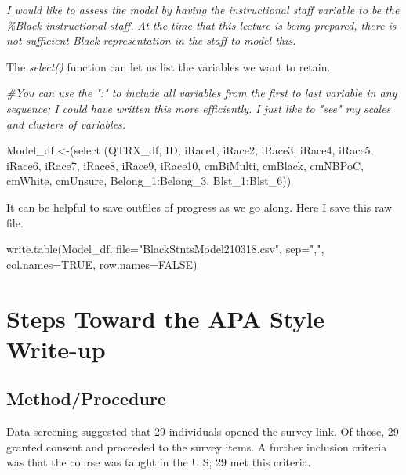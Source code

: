 \documentclass[
  english,
]{book}
\newenvironment{Shaded}{\begin{snugshade}}{\end{snugshade}}
\newcommand{\AttributeTok}[1]{\textcolor[rgb]{0.77,0.63,0.00}{#1}}
\newcommand{\CommentTok}[1]{\textcolor[rgb]{0.56,0.35,0.01}{\textit{#1}}}
\newcommand{\ConstantTok}[1]{\textcolor[rgb]{0.00,0.00,0.00}{#1}}
\newcommand{\FunctionTok}[1]{\textcolor[rgb]{0.00,0.00,0.00}{#1}}
\newcommand{\NormalTok}[1]{#1}
\newcommand{\OtherTok}[1]{\textcolor[rgb]{0.56,0.35,0.01}{#1}}
\newcommand{\SpecialCharTok}[1]{\textcolor[rgb]{0.00,0.00,0.00}{#1}}
\newcommand{\StringTok}[1]{\textcolor[rgb]{0.31,0.60,0.02}{#1}}
\begin{document}
\emph{I would like to assess the model by having the instructional staff variable to be the \%Black instructional staff. At the time that this lecture is being prepared, there is not sufficient Black representation in the staff to model this.}

The \emph{select()} function can let us list the variables we want to retain.

\begin{Shaded}
\begin{Highlighting}[]
\CommentTok{\#You can use the ":" to include all variables from the first to last variable in any sequence; I could have written this more efficiently.  I just like to "see" my scales and clusters of variables.}

\NormalTok{Model\_df }\OtherTok{\textless{}{-}}\NormalTok{(}\FunctionTok{select}\NormalTok{ (QTRX\_df, ID, iRace1, iRace2, iRace3, iRace4, iRace5, iRace6, iRace7, iRace8, iRace9, iRace10, cmBiMulti, cmBlack, cmNBPoC, cmWhite, cmUnsure, Belong\_1}\SpecialCharTok{:}\NormalTok{Belong\_3, Blst\_1}\SpecialCharTok{:}\NormalTok{Blst\_6))}
\end{Highlighting}
\end{Shaded}

It can be helpful to save outfiles of progress as we go along. Here I save this raw file.

\begin{Shaded}
\begin{Highlighting}[]
\FunctionTok{write.table}\NormalTok{(Model\_df, }\AttributeTok{file=}\StringTok{"BlackStntsModel210318.csv"}\NormalTok{, }\AttributeTok{sep=}\StringTok{","}\NormalTok{, }\AttributeTok{col.names=}\ConstantTok{TRUE}\NormalTok{, }\AttributeTok{row.names=}\ConstantTok{FALSE}\NormalTok{)}
\end{Highlighting}
\end{Shaded}

\hypertarget{steps-toward-the-apa-style-write-up}{%
\section{Steps Toward the APA Style Write-up}\label{steps-toward-the-apa-style-write-up}}

\hypertarget{methodprocedure}{%
\subsection{Method/Procedure}\label{methodprocedure}}

Data screening suggested that 29 individuals opened the survey link. Of those, 29 granted consent and proceeded to the survey items. A further inclusion criteria was that the course was taught in the U.S; 29 met this criteria.
\end{document}
